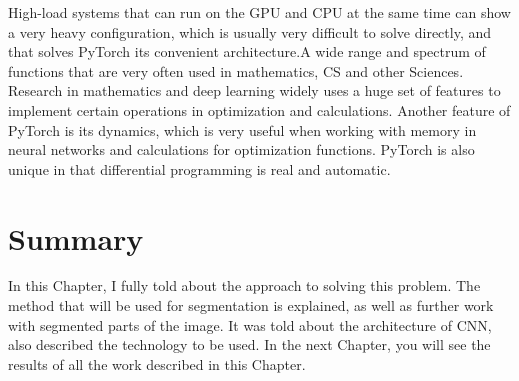 \par High-load systems that can run on the GPU and CPU at the same time can show a very heavy configuration, which is usually very difficult to solve directly, and that solves PyTorch its convenient architecture.A wide range and spectrum of functions that are very often used in mathematics, CS and other Sciences. Research in mathematics and deep learning widely uses a huge set of features to implement certain operations in optimization and calculations. Another feature of PyTorch is its dynamics, which is very useful when working with memory in neural networks and calculations for optimization functions. PyTorch is also unique in that differential programming is real and automatic.


\section{Summary}\label{sec:4.5}
\par In this Chapter, I fully told about the approach to solving this problem. The method that will be used for segmentation is explained, as well as further work with segmented parts of the image. It was told about the architecture of CNN, also described the technology to be used. In the next Chapter, you will see the results of all the work described in this Chapter.
